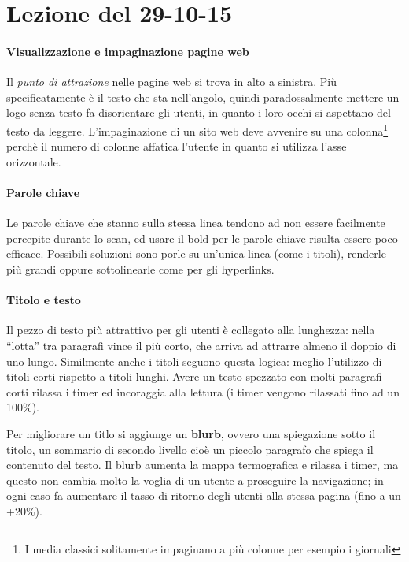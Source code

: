 \section{Lezione del 29-10-15}

\paragraph*{Visualizzazione e impaginazione pagine web}Il \textit{punto di attrazione} nelle pagine web si trova in alto a sinistra. Pi\`u specificatamente \`e il testo che sta nell'angolo, quindi paradossalmente mettere un logo senza testo fa disorientare gli utenti, in quanto i loro occhi si aspettano del testo da leggere.
L'impaginazione di un sito web deve avvenire su una colonna\footnote{I media classici solitamente impaginano a pi\`u colonne per esempio i giornali} perch\`e il numero di colonne affatica l'utente in quanto si utilizza l'asse orizzontale.

\paragraph*{Parole chiave}Le parole chiave che stanno sulla stessa linea tendono ad non essere facilmente percepite durante lo scan, ed usare il bold per le parole chiave risulta essere poco efficace. Possibili soluzioni sono porle su un'unica linea (come i titoli), renderle pi\`u grandi oppure sottolinearle come per gli hyperlinks.

\paragraph*{Titolo e testo}Il pezzo di testo pi\`u attrattivo per gli utenti \`e collegato alla lunghezza: nella ``lotta'' tra paragrafi vince il pi\`u corto, che arriva ad attrarre almeno il doppio di uno lungo. Similmente anche i titoli seguono questa logica: meglio l'utilizzo di titoli corti rispetto a titoli lunghi. Avere un testo spezzato con molti paragrafi corti rilassa i timer ed incoraggia alla lettura (i timer vengono rilassati fino ad un 100\%).

Per migliorare un titlo si aggiunge un \textbf{blurb}, ovvero una spiegazione sotto il titolo, un sommario di secondo livello cio\`e un piccolo paragrafo che spiega il contenuto del testo. Il blurb aumenta la mappa termografica e rilassa i timer, ma questo non cambia molto la voglia di un utente a proseguire la navigazione; in ogni caso fa aumentare il tasso di ritorno degli utenti alla stessa pagina (fino a un +20\%).

